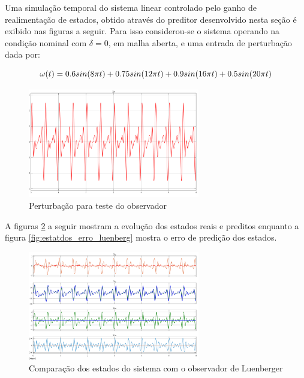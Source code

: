 Uma simulação temporal do sistema linear controlado pelo ganho de realimentação de estados, obtido através do preditor desenvolvido nesta seção é exibido nas figuras a seguir. Para isso considerou-se o sistema operando na condição nominal com $\delta=0$, em malha aberta, e uma entrada de perturbação dada por:

\begin{equation}\label{eq:estatdos_perturbacao} \footnotesize
    \omega(t)=0.6sin(8\pi t)+0.75sin(12\pi t)+0.9sin(16\pi t)+0.5sin(20\pi t)
\end{equation}

\FloatBarrier
\begin{figure}[htbp]
    \begin{centering}
    \includegraphics[width=7.5cm]{img/estatdos_perturbacao.png} 
    \caption{Perturbação para teste do observador}
    \label{fig:estatdos_perturbacao}
    \end{centering}
\end{figure}
\FloatBarrier

A figuras \ref{fig:estatdos_luenberger} a seguir mostram a evolução dos estados reais e preditos enquanto a figura \ref{fig:estatdos_erro_luenberg} mostra o erro de predição dos estados.

\FloatBarrier
\begin{figure}[htbp]
    \begin{centering}
    \includegraphics[width=7.5cm]{img/estatdos_luenberger.png} 
    \caption{Comparação dos estados do sistema com o observador de Luenberger}
    \label{fig:estatdos_luenberger}
    \end{centering}
\end{figure}
\FloatBarrier

